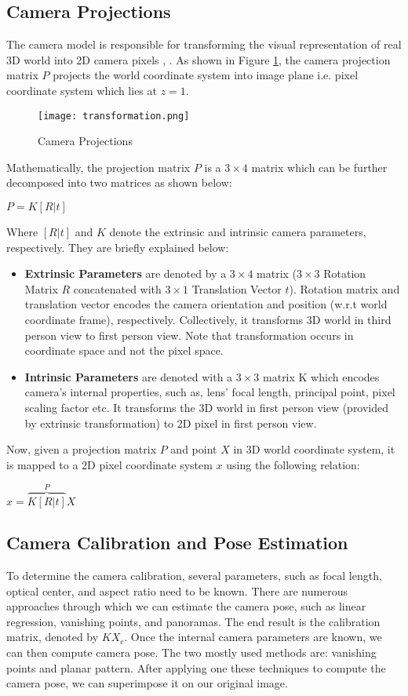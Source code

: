 \documentclass[11pt, a4paper, openany]{article}
\begin{document}
\subsection{Camera Projections} The camera model is responsible for transforming the visual representation of real 3D world into 2D camera pixels \cite{camera model}, \cite{camera model2}. As shown in Figure \ref{fig:cameraprojs}, the camera projection matrix $P$ projects the world coordinate system into image plane i.e. pixel coordinate system which lies at $z = 1$.

\begin{figure}
  \texttt{[image: transformation.png]}
  \caption{Camera Projections}
  \label{fig:cameraprojs}
\end{figure}

Mathematically, the projection matrix $P$ is a $3\times4$ matrix which can be further decomposed into two matrices as shown below:
\begin{center}$P = K[R|t]$\end{center}
Where $[R|t]$ and $K$ denote the extrinsic and intrinsic camera parameters, respectively. They are briefly explained below:
\begin{itemize}
\item \textbf{Extrinsic Parameters} are denoted by a $3\times4$ matrix ($3\times3$ Rotation Matrix $R$ concatenated with $3\times1$ Translation Vector $t$). Rotation matrix and translation vector encodes the camera orientation and position (w.r.t world coordinate frame), respectively. Collectively, it transforms 3D world in third person view to first person view. Note that transformation occurs in coordinate space and not the pixel space.
\item \textbf{Intrinsic Parameters} are denoted with a $3\times3$ matrix K which encodes camera's internal properties, such as, lens'  focal length, principal point, pixel scaling factor etc. It transforms the 3D world in first person view (provided by extrinsic transformation) to 2D pixel in first person view.
\end{itemize}
Now, given a projection matrix $P$ and point $X$ in 3D world coordinate system, it is mapped to a 2D pixel coordinate system $x$ using the following relation:
\begin{center}$x = \overset{P}{\overbrace{K[R|t]}}X$\end{center}

\subsection{Camera Calibration and Pose Estimation} To determine the camera calibration, several parameters, such as focal length, optical center, and aspect ratio need to be known. There are numerous approaches through which we can estimate the camera pose, such as  linear regression, vanishing points, and panoramas. The end result is the calibration matrix, denoted by $KX_{c}$.\newline
Once the internal camera parameters are known, we can then compute camera pose. The two mostly used methods are: vanishing points and planar pattern. After applying one these techniques to compute the camera pose, we can superimpose it on our original image.
\end{document}
